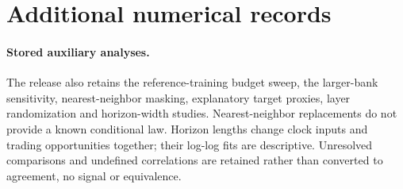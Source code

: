 \documentclass[10pt,twocolumn]{article}
\begin{document}
\section{Additional numerical records}
\begin{table}[!ht]
\centering\small
\caption{Every market-seed comparison against the primary bank. These remain
descriptive comparisons with a synthetic reference population.}
\MarketSeedTable
\end{table}
\begin{table}[!ht]
\centering\small
\caption{Descriptive cost-enabled baseline returns on the same held-out
episodes. A lower mean is not a statement about which model has a faithful
explanation. The momentum fallback is labeled explicitly.}
\BaselineTable
\end{table}
\begin{table}[!ht]
\centering\small
\caption{All steering penalties. Attribution shares concern the specified
behaviour proxy. Return differences use common evaluation blocks and paired
training seeds. An interval containing zero does not establish equivalence.}
\SteeringTable
\end{table}
\begin{table}[!ht]
\centering\small
\caption{State-preservation spans and crossed seed/block intervals.}
\StateTable
\end{table}
\paragraph{Stored auxiliary analyses.}
The release also retains the reference-training budget sweep, the larger-bank
sensitivity, nearest-neighbor masking, explanatory target proxies, layer
randomization and horizon-width studies. Nearest-neighbor replacements do not
provide a known conditional law. Horizon lengths change clock inputs and
trading opportunities together; their log-log fits are descriptive. Unresolved
comparisons and undefined correlations are retained rather than converted to
agreement, no signal or equivalence.
\fi


\end{document}
